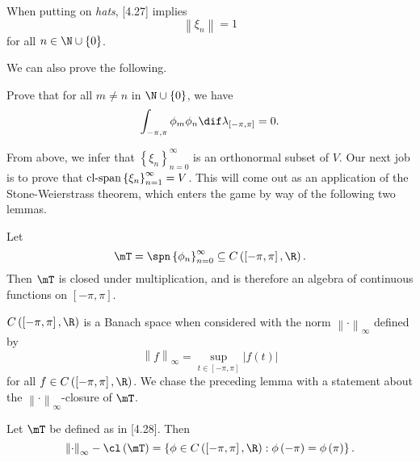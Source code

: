 \documentclass[pmath450]{subfiles}
\begin{document}
    When putting on \textit{hats}, [4.27] implies
    \begin{equation*}
        \left\lVert \xi_n\right\rVert = 1
    \end{equation*}
    for all $n\in\N\cup\left\lbrace 0 \right\rbrace$.

    \np We can also prove the following.

    \begin{exercise}{}
        Prove that for all $m\neq n$ in $\N\cup\left\lbrace 0 \right\rbrace$, we have
        \begin{equation*}
            \int_{-\pi,\pi}\phi_m\phi_n\dif\lambda_{\left[ -\pi,\pi \right]} = 0.
        \end{equation*}
    \end{exercise}

    \rruleline

    \np From above, we infer that $\left\lbrace \xi_n \right\rbrace^{\infty}_{n=0}$ is an orthonormal subset of $V$. Our next job is to prove that $\operatorname{cl-span}\left\lbrace \xi_n \right\rbrace^{\infty}_{n=1}=V$. This will come out as an application of the Stone-Weierstrass theorem, which enters the game by way of the following two lemmas.
    
    \begin{lemma}{}
        Let
        \begin{equation}
            \mT = \spn\left\lbrace \phi_n \right\rbrace^{\infty}_{n=0} \subseteq C\left( \left[ -\pi,\pi \right],\R \right).
        \end{equation}
        Then $\mT$ is closed under multiplication, and is therefore an algebra of continuous functions on $\left[ -\pi,\pi \right]$.
    \end{lemma}

    
    \np $C\left( \left[ -\pi,\pi \right],\R \right)$ is a Banach space when considered with the norm $\left\lVert \cdot\right\rVert_{\infty}$ defined by
    \begin{equation*}
        \left\lVert f \right\rVert_{\infty} = \sup_{t\in\left[ -\pi,\pi \right]} \left| f\left( t \right) \right|
    \end{equation*}
for all $f\in C\left( \left[ -\pi,\pi \right],\R \right)$. We chase the preceding lemma with a statement about the $\left\lVert \cdot\right\rVert_\infty$-closure of $\mT$.

    \begin{lemma}{}
        Let $\mT$ be defined as in [4.28]. Then
        \begin{equation*}
            \left\lVert \cdot \right\rVert_{\infty}-\cl\left( \mT \right) = \left\lbrace \phi\in C\left( \left[ -\pi,\pi \right],\R \right): \phi\left( -\pi \right)=\phi\left( \pi \right) \right\rbrace.
        \end{equation*}
    \end{lemma}
\end{document}
